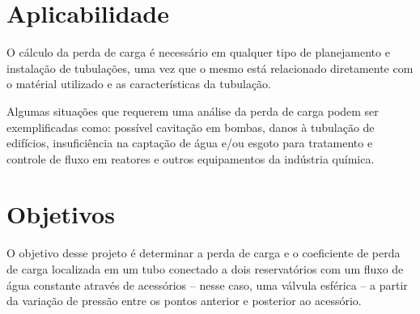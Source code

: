 \section{Aplicabilidade}

O cálculo da perda de carga é necessário em qualquer tipo de planejamento
e instalação de tubulações, uma vez que o mesmo está relacionado diretamente
com o matérial utilizado e as características da tubulação.

Algumas situações que requerem uma análise da perda de carga podem ser 
exemplificadas como: possível cavitação em bombas, danos à tubulação
de edifícios, insuficiência na captação de água e/ou esgoto para
tratamento e controle de fluxo em reatores e outros  equipamentos da indústria química.

\section{Objetivos}

O objetivo desse projeto é determinar a perda de carga e o coeficiente de 
perda de carga localizada em um tubo conectado a dois reservatórios com
um fluxo de água constante através de acessórios -- nesse caso, uma válvula
esférica -- a partir da variação de pressão entre os pontos
anterior e posterior ao acessório.

